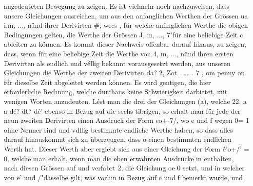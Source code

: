 \documentclass[11pt]{article}
\begin{document}
angedeuteten Bewegung zu zeigen. Es ist vielmehr noch nachzuweisen, dass unsere
Gleichungen ausreichen, um aus den anfanglichen Werthen der Grössen ua i,m, ..., nünd
ihrer Derivirten \#, wees , für welche anfinglichen Werthe die obigen Bedingungen gelten,
die Werthe der Grössen J, m, ..., 7"für eine beliebige Zeit c ableiten zu können. Es kommt
dieser Nachweis offenbar darauf hinaus, zu zeigen, dass, wenn für eine beliebige Zeit die
Werthe von 4, m, ..., nünd ihren ersten Derivirten als endlich und véllig bekannt vorausgesetzt werden, aus unseren Gleichungen die Werthe der zweiten Derivirten da? 2, Zot .
. . . 7 , om penny on für dieselbe Zeit abgeleitet werden können. Es wird gentigen, die
hier erforderliche Rechnung, welche durchaus keine Schwierigkeit darbietet, mit wenigen
Worten anzudeuten. Lést man die drei der Gleichungen (a), welche 22, a a dé? dt? dé’
ebenso in Bezug auf die sechs tibrigen, so erhalt man für jede der neun zweiten Derivirten
einen Ausdruck der Form eo+-7/, wo e und f wegen 0= 1 ohne Nenner sind und vdllig
bestimmte endliche Werthe haben, so dass alles darauf hinauskommt sich zu überzeugen,
dass o einen bestimmten endlichen Werth hat. Dieser Werth aber ergiebt sich aus einer
Gleichung der Form é’o+/’ = 0, welche man erhalt, wenn man die eben erwahnten Ausdrücke in enthalten, nach diesen Grössen auf und verfabrt 2, die Gleichung oe 0 setzt, und
in welcher von e’ und /"dasselbe gilt, was vorhin in Bezug auf e und f bemerkt wurde, und
\end{document}

